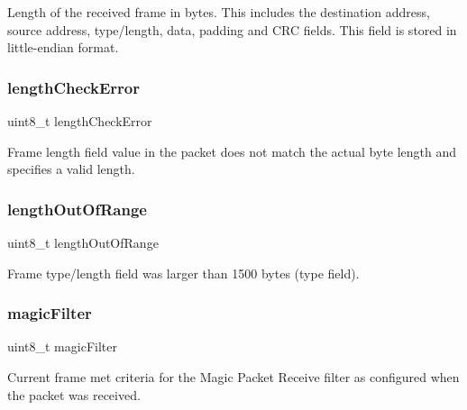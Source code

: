 Length of the received frame in bytes. This includes the destination address, source address, type/length, data, padding and C\+RC fields. This field is stored in little-\/endian format. \mbox{\label{struct_r_s_v___aa1ee2560cad39e2579609aa0bbe23622}} 
\subsubsection{\texorpdfstring{lengthCheckError}{lengthCheckError}}
{\footnotesize\ttfamily uint8\+\_\+t length\+Check\+Error}



Frame length field value in the packet does not match the actual byte length and specifies a valid length. 

\mbox{\label{struct_r_s_v___addceef1c25a3a79f0809d2088d7fad31}} 
\subsubsection{\texorpdfstring{lengthOutOfRange}{lengthOutOfRange}}
{\footnotesize\ttfamily uint8\+\_\+t length\+Out\+Of\+Range}



Frame type/length field was larger than 1500 bytes (type field). 

\mbox{\label{struct_r_s_v___a1369352b01723f3fe85ae1504216e1fa}} 
\subsubsection{\texorpdfstring{magicFilter}{magicFilter}}
{\footnotesize\ttfamily uint8\+\_\+t magic\+Filter}



Current frame met criteria for the Magic Packet Receive filter as configured when the packet was received. 

\mbox{\label{struct_r_s_v___ab40062c1424a2dfaf51425eb5f3ebb6e}} 
